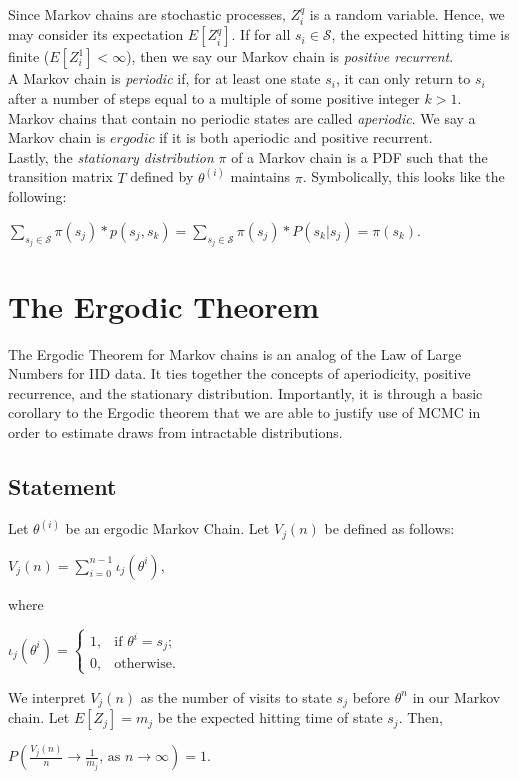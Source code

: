 \documentclass[12pt,twoside]{reedthesis}
\begin{document}
		Since Markov chains are stochastic processes, $Z^{q}_i$ is a random variable. Hence, we may consider its expectation $E[Z^{q}_i]$. If for all $s_i \in \mathcal S$, the expected hitting time is finite ($E[Z^{1}_i] < \infty$), then we say our Markov chain is {\em positive recurrent}. \\
		
		A Markov chain is {\em periodic} if, for at least one state $s_i$, it can only return to $s_i$ after a number of steps equal to a multiple of some positive integer $k > 1$. Markov chains that contain no periodic states are called {\em aperiodic}. We say a Markov chain is $ergodic$ if it is both aperiodic and positive recurrent. \\
		
		Lastly, the {\em stationary distribution} $\pi$ of a Markov chain is a PDF such that the transition matrix $T$ defined by $\theta^{(i)}$ maintains $\pi$. Symbolically, this looks like the following:
		\begin{center}
			$\displaystyle\sum_{s_j \in \mathcal S} \pi(s_j) * p(s_j,s_k) 
			= \displaystyle\sum_{s_j \in \mathcal S} \pi(s_j) * P(s_k | s_j)
			= \pi(s_k)$.
		\end{center}	
		\section{The Ergodic Theorem}
		The Ergodic Theorem for Markov chains is an analog of the Law of Large Numbers for IID data. It ties together the concepts of aperiodicity, positive recurrence, and the stationary distribution. Importantly, it is through a basic corollary to the Ergodic theorem that we are able to justify use of MCMC in order to estimate draws from intractable distributions.
		\subsection*{Statement}
		Let $\theta^{(i)}$ be an ergodic Markov Chain. 
		Let $V_j(n)$ be defined as follows:
		\begin{center}
			$V_j(n) = \displaystyle\sum_{i=0}^{n-1} \iota_j(\theta^{i})$,
		\end{center}
		where
		\begin{center}
			$\iota_j(\theta^i) = \begin{cases} 
				1, & \textrm{if\ \ \ } \theta^i = s_j; \\
				0, & \textrm{otherwise}. 
				\end{cases}
			$
		\end{center}
		We interpret $V_j(n)$ as the number of visits to state $s_j$ before $\theta^n$ in our Markov chain. 
		Let $E[Z_j] = m_j$ be the expected hitting time of state $s_j$. Then,
		\begin{center}
			$P\left(\displaystyle\frac{V_j(n)}{n} \longrightarrow \frac{1}{m_j}
			\textrm{, as } n \rightarrow \infty \right) = 1$.
		\end{center}
		
\end{document}
